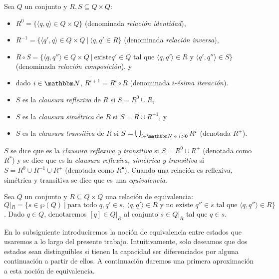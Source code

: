 \begin{definition} 
Sea $Q$ un conjunto y $R, S \subseteq Q \times Q$:
\begin{itemize}
\item $R^0 = \{\langle q, q \rangle \in Q \times Q\}$ (denominada \emph{relación identidad}),
\item $R^{-1} = \{\langle q', q \rangle \in Q \times Q\ |\ \langle q, q' \in R\}$ (denominada \emph{relación inversa}), 
\item $R \circ S = \{\langle q, q'' \rangle \in Q \times Q\ |\ \text{existe} q' \in Q \text{ tal que } \langle q, q' \rangle \in R \text{ y } \langle q', q'' \rangle \in S\}$ (denominada \emph{relación composición}), y
\item dado $i \in \nat$, $R^{i+1} = R^{i} \circ R$ (denominada \emph{$i$-ésima iteración}).
\end{itemize}
\begin{itemize}
    \item $S$ es la \emph{clausura reflexiva} de $R$ si $S = R^0 \cup R$,
    \item $S$ es la \emph{clausura simétrica} de $R$ si $S = R \cup R^{-1}$, y
    \item $S$ es la \emph{clausura transitiva} de $R$ si $S = \bigcup_{i \in \nat \text{ e } i > 0} R^i$ (denotada $R^+$).
\end{itemize}
$S$ se dice que es la \emph{clausura reflexiva y transitiva} si $S = R^0 \cup R^+$ (denotada como $R^*$) y se dice que es la \emph{clausura reflexiva, simétrica y transitiva} si $S = R^0 \cup R^{-1} \cup R^+$ (denotada como $R^\bullet$). Cuando una relación es reflexiva, simétrica y transitiva se dice que es una \emph{equivalencia}.
\end{definition}

\begin{definition}
Sea $Q$ un conjunto y $R \subseteq Q \times Q$ una relación de equivalencia:
$Q|_R = \{s \in \wp(Q)\ |\ \text{para todo } q, q' \in s \text{, } \langle q, q' \rangle \in R \text{ y no existe } q'' \in \overline{s} \text{ tal que } \langle q, q'' \rangle \in R\}$. Dado $q \in Q$, denotaremos $[q] \in Q|_R$ al conjunto $s \in Q|_R$ tal que $q \in s$. 
\end{definition}

En lo subsiguiente introduciremos la noción de equivalencia entre estados que usaremos a lo largo del presente trabajo. Intuitivamente, solo deseamos que dos estados sean distinguibles si tienen la capacidad ser diferenciados por alguna continuación a partir de ellos. A continuación daremos una primera aproximación a esta noción de equivalencia.

